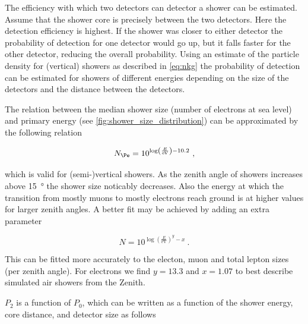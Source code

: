 The efficiency with which two detectors can detector a shower can be estimated. Assume that the shower core is precisely between the two detectors. Here the detection efficiency is highest. If the shower was closer to either detector the probability of detection for one detector would go up, but it falls faster for the other detector, reducing the overall probability. Using an estimate of the particle density for (vertical) showers as described in \cref{eq:nkg} the probability of detection can be estimated for showers of different energies depending on the size of the detectors and the distance between the detectors.

The relation between the median shower size (number of electrons at sea level) and primary energy (see \cref{fig:shower_size_distribution}) can be approximated by the following relation

\begin{equation}
    N_{\Pe} = 10^{\log\left(\frac{E}{\si{\eV}}\right) - 10.2} \ ,
\end{equation}

which is valid for (semi-)vertical showers. As the zenith angle of showers increases above \SI{15}{\degree} the shower size noticably decreases. Also the energy at which the transition from mostly muons to mostly electrons reach ground is at higher values for larger zenith angles. A better fit may be achieved by adding an extra parameter

\begin{equation}
    N = 10^{\log\left(\frac{E}{\si{\eV}}\right)^y - x} \ .
\end{equation}

This can be fitted more accurately to the electon, muon and total lepton sizes (per zenith angle). For electrons we find $y = 13.3$ and $x = 1.07$ to best describe simulated air showers from the Zenith.

$P_2$ is a function of $P_0$, which can be written as a function of the shower energy, core distance, and detector size as follows

